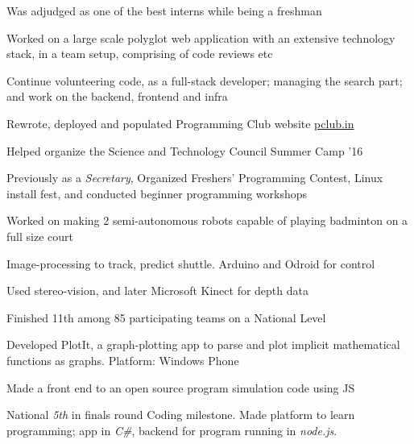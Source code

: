 \documentclass[a4paper]{deedy-resume} %
\begin{document}
\begin{minipage}[t]{0.66\textwidth}
  \sectionspace

  \runsubsection{}
   

  \begin{tightitemize}
  \item Was adjudged as one of the best interns while being a freshman
  \item Worked on a large scale polyglot web application with an extensive
    technology stack, in a team setup, comprising of code reviews etc
  \item Continue volunteering code, as a full-stack developer;
    managing the search part; and work on the backend, frontend and infra
  \end{tightitemize}

  \sectionspace

  \runsubsection{}
  \begin{tightitemize}
  \item Rewrote, deployed and populated Programming Club website \href{https://pclub.in}{pclub.in}
  \item Helped organize the Science and Technology Council Summer Camp
    '16
  \item Previously as a \textit{Secretary}, Organized Freshers'
    Programming Contest, Linux install fest, and conducted beginner
    programming workshops
  \end{tightitemize}

  \sectionspace

  \runsubsection{}
  \begin{tightitemize}
  \item Worked on making 2 semi-autonomous robots capable of playing badminton on a full size court
  \item Image-processing to track, predict shuttle. Arduino and Odroid for control
  \item Used stereo-vision, and later Microsoft Kinect for depth data
  \item Finished 11th among 85 participating teams on a National Level
  \end{tightitemize}

  \sectionspace

  \runsubsection{}
  \begin{tightitemize}
  \item Developed PlotIt, a graph-plotting app to parse and plot
    implicit mathematical functions as graphs. Platform: Windows
    Phone
  \item Made a front end to an open source program simulation code
    using JS
  \item National \textit{5th} in finals round Coding milestone.
    Made platform to learn programming; app in
    \textit{C\#}, backend for program running in \textit{node.js}.
  \end{tightitemize}


\end{minipage}
\end{document}
